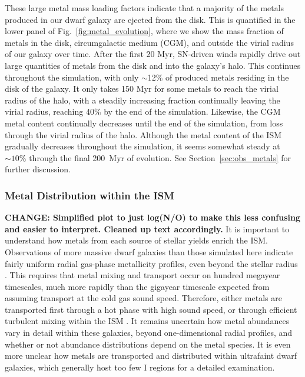 \documentclass[twocolumn]{aastex61}
\begin{document}
These large metal mass loading factors indicate that a majority of the metals produced in our dwarf galaxy are ejected from the disk. This is quantified in the lower panel of Fig.~\ref{fig:metal_evolution}, where we show the mass fraction of metals in the disk, circumgalactic medium (CGM), and outside the virial radius of our galaxy over time. After the first 20 Myr, SN-driven winds rapidly drive out large quantities of metals from the disk and into the galaxy's halo. This continues throughout the simulation, with only $\sim$12\% of produced metals residing in the disk of the galaxy. It only takes 150 Myr for some metals to reach the virial radius of the halo, with a steadily increasing fraction continually leaving the virial radius, reaching 40\% by the end of the simulation. Likewise, the CGM metal content continually decreases until the end of the simulation, from loss through the virial radius of the halo. Although the metal content of the ISM gradually decreases throughout the simulation, it seems somewhat steady at $\sim 10\%$ through the final 200~Myr of evolution. See Section~\ref{sec:obs_metals} for further discussion.

\subsubsection{Metal Distribution within the ISM}
\textbf{CHANGE: Simplified plot to just log(N/O) to make this less confusing and easier to interpret. Cleaned up text accordingly.}
It is important to understand how metals from each source of stellar yields enrich the ISM. Observations of more massive dwarf galaxies than those simulated here indicate fairly uniform radial gas-phase metallicity profiles, even beyond the stellar radius \citep[e.g.][]{Werk2011,Belfiore2017}. This requires that metal mixing and transport occur on hundred megayear timescales, much more rapidly than the gigayear timescale expected from assuming transport at the cold gas sound speed. Therefore, either metals are transported first through a hot phase with high sound speed, or through efficient turbulent mixing within the ISM \citep[e.g.][]{Tassis2008,YangKrumholz2012}. It remains uncertain how metal abundances vary in detail within these galaxies, beyond one-dimensional radial profiles, and whether or not abundance distributions depend on the metal species. It is even more unclear how metals are transported and distributed within ultrafaint dwarf galaxies, which generally host too few I regions for a detailed examination.
\end{document}
